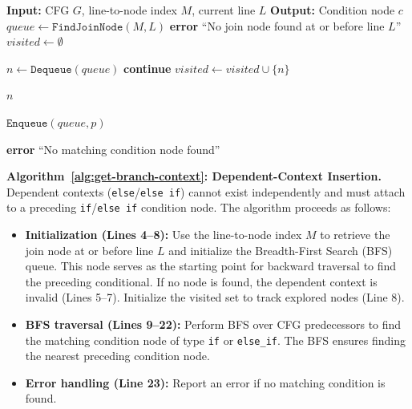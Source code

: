 \documentclass[pdflatex,sn-basic]{sn-jnl}%
\theoremstyle{thmstyleone}%
\theoremstyle{thmstyletwo}%
\theoremstyle{thmstylethree}%
\begin{document}
\begin{algorithm}[!ht]
\caption{Dependent-Context Insertion}
\label{alg:get-branch-context}
\begin{algorithmic}[1]
\State \textbf{Input:} CFG $G$, line-to-node index $M$, current line $L$
\State \textbf{Output:} Condition node $c$
  \State $queue \gets \texttt{FindJoinNode}(M, L)$ 
   \State \textbf{error} ``No join node found at or before line $L$'' \EndIf
  \State $visited \gets \emptyset$

   
    \State $n \gets \texttt{Dequeue}(queue)$
     \textbf{continue} \EndIf
    \State $visited \gets visited\cup\{n\}$

      \State \Return $n$
    \EndIf

       \State $\texttt{Enqueue}(queue,p)$ \EndIf
    \EndFor
  \EndWhile

  \State \textbf{error} ``No matching condition node found''
\EndFunction
\end{algorithmic}
\end{algorithm}

\noindent\textbf{Algorithm~\ref{alg:get-branch-context}: Dependent-Context Insertion.}
Dependent contexts (\texttt{else}/\texttt{else if}) cannot exist independently and must attach to a preceding
\texttt{if}/\texttt{else if} condition node. The algorithm proceeds as follows:
\begin{itemize}
  \item \textbf{Initialization (Lines 4--8):} Use the line-to-node index $M$ to retrieve the join node at or before line \(L\) and initialize the Breadth-First Search (BFS) queue. This node serves as the starting point for backward traversal to find the preceding conditional. If no node is found, the dependent context is invalid (Lines 5--7). Initialize the visited set to track explored nodes (Line 8).
  \item \textbf{BFS traversal (Lines 9--22):} Perform BFS over CFG predecessors to find the matching condition node of type \texttt{if} or \texttt{else\_if}. The BFS ensures finding the nearest preceding condition node.
  \item \textbf{Error handling (Line 23):} Report an error if no matching condition is found.
\end{itemize}
\end{document}
